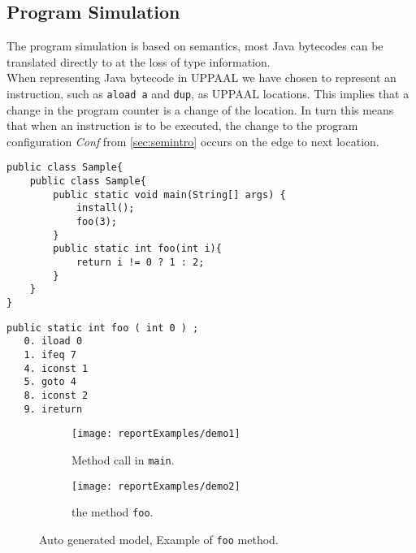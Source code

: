 \subsection{Program Simulation}
The program simulation is based on \jcl semantics, most Java bytecodes can be translated directly to \jcl at the loss of type information.\\
When representing Java bytecode in UPPAAL we have chosen to represent an instruction, such as \texttt{aload a} and \texttt{dup}, as UPPAAL locations. 
This implies that a change in the program counter is a change of the location. 
In turn this means that when an instruction is to be executed, the change to the program configuration \textit{Conf} from  \cref{sec:semintro} occurs on the edge to next location.

\begin{minipage}{\linewidth}
\begin{lstlisting}[caption=Java code sample.]
public class Sample{
    public class Sample{
        public static void main(String[] args) {
            install();
            foo(3);
        }
        public static int foo(int i){
            return i != 0 ? 1 : 2;
        }
    }
}
\end{lstlisting}
\end{minipage}
\begin{minipage}{\linewidth}
\begin{lstlisting}[caption=Bytecode sample.]
public static int foo ( int 0 ) ;
   0. iload 0
   1. ifeq 7
   4. iconst 1
   5. goto 4
   8. iconst 2
   9. ireturn
\end{lstlisting}
\end{minipage}

\begin{figure}
\begin{subfigure}{\textwidth}
	\texttt{[image: reportExamples/demo1]}
	\caption{Method call in \texttt{main}.}
\end{subfigure}
\begin{subfigure}{\textwidth}
	\texttt{[image: reportExamples/demo2]}
	\caption{the method \texttt{foo}.}

\end{subfigure}

\caption{Auto generated model, Example of \texttt{foo} method.}
\label{fig:fooMethod}
\end{figure}


